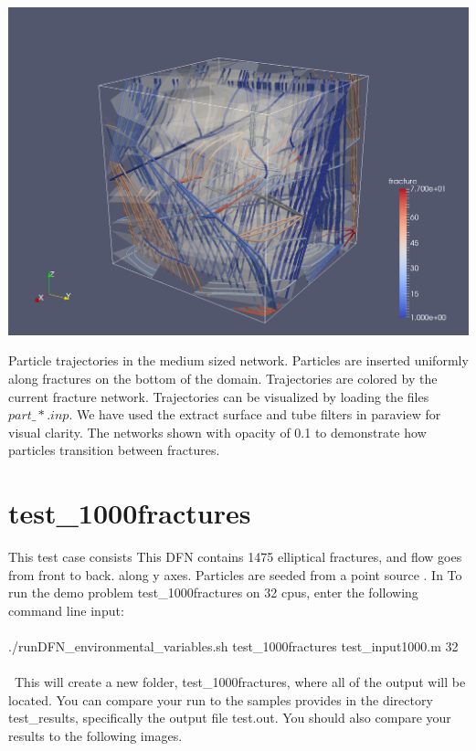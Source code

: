 \documentclass{article}
\begin{document}
\begin{center}
\includegraphics[width=0.75\linewidth]{figs/test_100_fracture_trajectories.png}\\
\end{center}
Particle trajectories in the medium sized network.    
Particles are inserted uniformly along fractures on the bottom of the domain.  
Trajectories are colored by the current fracture network. 
Trajectories can be visualized by loading the files $part\_*.inp$. 
 We have used the extract surface and tube filters in paraview for visual clarity. 
The networks shown with opacity of 0.1 to demonstrate how particles transition between fractures.


\newpage 

\section{test\_1000fractures}

This test case consists This DFN contains 1475 elliptical fractures, and flow goes from front to back. along y axes. Particles are seeded from a point source . In 
To run the demo problem test\_1000fractures on 32 cpus, enter the following command line input:\\\\
 ./runDFN\_environmental\_variables.sh test\_1000fractures test\_input1000.m 32\\\\\
 This will create a new folder, test\_1000fractures, where all of the output will be located. 
You can compare your run to the samples provides in the directory test\_results, specifically the output file test.out.
You should also compare your results to the following images. 
\end{document}
